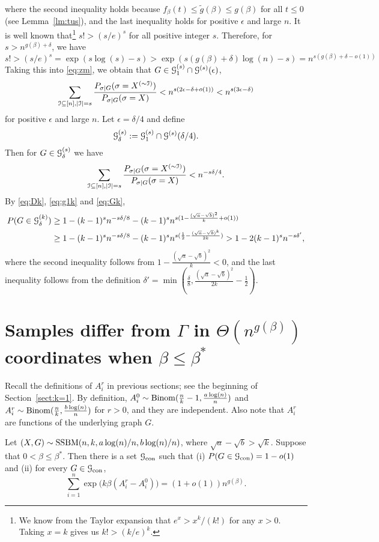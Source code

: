 \documentclass{article}
\begin{document}
where the second inequality holds because
$f_{\beta}(t)\le \tilde{g}(\beta) \le g(\beta)$ for all $t\le 0$
(see  Lemma~\ref{lm:tus}), and the last inequality holds for positive $\epsilon$ and large $n$.
It is well known that\footnote{We know from the Taylor expansion that $e^x>x^k/(k!)$ for any $x>0$. Taking $x=k$ gives us $k!>(k/e)^k$.}
$s!>(s/e)^s$
for all positive integer $s$.
Therefore, for $s>n^{g(\beta)+\delta}$, we have
$$
s!>(s/e)^s
=\exp(s\log(s)-s)
>\exp(s(g(\beta)+\delta)\log(n)-s)
=n^{s(g(\beta)+\delta-o(1))}
$$
Taking this into \eqref{eq:zm}, we obtain that $G\in\mathcal{G}_1^{(s)}\cap\mathcal{G}^{(s)}(\epsilon)$,
$$
\sum_{\mathcal{I}\subseteq[n],|\mathcal{I}|=s}
\frac{P_{\sigma|G}(\sigma=X^{(\sim \mathcal{I})} )}
{P_{\sigma|G}(\sigma=X)} 
< n^{s(2\epsilon-\delta+o(1))}
< n^{s(3\epsilon-\delta)}
$$
for positive $\epsilon$ and large $n$.
Let $\epsilon=\delta/4$ and define 
$$
\mathcal{G}_{\delta}^{(s)}
:=\mathcal{G}_1^{(s)}\cap\mathcal{G}^{(s)}(\delta/4) .
$$
Then for $G\in\mathcal{G}_{\delta}^{(s)}$ we have
$$
\sum_{\mathcal{I}\subseteq[n],|\mathcal{I}|=s}
\frac{P_{\sigma|G}(\sigma=X^{(\sim \mathcal{I})} )}
{P_{\sigma|G}(\sigma=X)} <
n^{-s \delta /4} .
$$
By \eqref{eq:Dk}, \eqref{eq:g1k} and \eqref{eq:Gk}, 
\begin{align*}
P(G\in\mathcal{G}_{\delta}^{(k)})
& \ge 1-(k-1)^s n^{-s\delta/8}- (k-1)^s n^{s (1-\frac{(\sqrt{a}-\sqrt{b})^2}{k} + o(1) )} \\
& \ge 1-(k-1)^s n^{-s\delta/8}- (k-1)^sn^{s(\frac{1}{2}-\frac{(\sqrt{a}-\sqrt{b})^k}{2k} )}
> 1- 2 (k-1)^s n^{-s\delta'},
\end{align*}
where the second inequality follows from  $1-\frac{(\sqrt{a}-\sqrt{b})^2}{k}< 0$, and the last inequality follows from the definition $\delta'=\min(\frac{\delta}{8},\frac{(\sqrt{a}-\sqrt{b})^2}{2k} - \frac{1}{2})$.
\section{Samples differ from $\Gamma$ in $\Theta(n^{g(\beta)})$ coordinates when $\beta\le\beta^\ast$}  \label{sect:struct}
Recall the definitions of $A^r_i$ in previous sections; see the beginning of Section~\ref{sect:k=1}. 
By definition,
$A^0_i\sim \operatorname{Binom}(\frac{n}{k}-1,\frac{a\log(n)}{n})$ and $A^r_i\sim \operatorname{Binom}(\frac{n}{k}, \frac{b\log(n)}{n})$ for $r>0$, and they are independent. 
Also note that $A^r_i$ are functions of the underlying graph $G$.

\begin{proposition}  \label{prop:con}
Let $(X,G)\sim \operatorname{SSBM}(n,k, a\log(n)/n, b\log(n)/n)$, where $\sqrt{a}-\sqrt{b} > \sqrt{k}$.
Suppose that $0< \beta\le \beta^\ast$.
Then there is a set $\mathcal{G}_{\operatorname{con}}$ such that (i) $P(G \in \mathcal{G}_{\operatorname{con}}) = 1-o(1)$ and (ii) for every $G\in \mathcal{G}_{\operatorname{con}}$, 
$$
\sum_{i=1}^n \exp\big(k\beta (A^r_i-A^0_i) \big)
=(1+o(1)) n^{g(\beta)} .
$$
\end{proposition}
\end{document}
